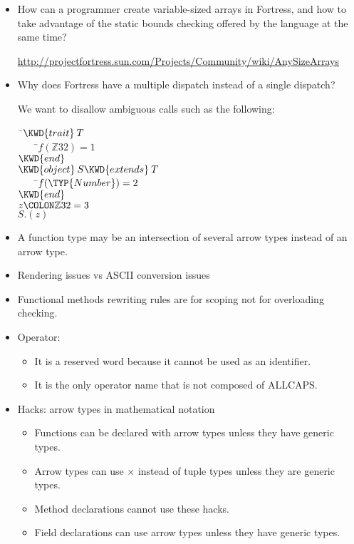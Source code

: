 \begin{itemize}
\item How can a programmer create variable-sized arrays in Fortress, and how to take advantage of the static bounds checking offered by the language at the same time?

\url{http://projectfortress.sun.com/Projects/Community/wiki/AnySizeArrays}

\item Why does Fortress have a multiple dispatch instead of a single dispatch?

We want to disallow ambiguous calls such as the following:
\begin{Fortress}
{\tt~}\pushtabs\=\+\( \KWD{trait}\:T\)\\
{\tt~~~~}\pushtabs\=\+\(     f(\mathbb{Z}32) = 1\)\-\\\poptabs
\( \KWD{end}\)\\
\( \KWD{object}\:S \KWD{extends}\:T\)\\
{\tt~~~~}\pushtabs\=\+\(     f(\TYP{Number}) = 2\)\-\\\poptabs
\( \KWD{end}\)\\
\( z\COLON \mathbb{Z}32 = 3\)\\
\( S.(z)\)\-\\\poptabs
\end{Fortress}


\item A function type may be an intersection of several arrow types
instead of an arrow type.

\item Rendering issues vs ASCII conversion issues

\item Functional methods rewriting rules are for scoping
not for overloading checking.

\item Operator: 
  \begin{itemize}
  \item It is a reserved word because it cannot be used as an identifier.
  \item It is the only operator name that is not composed of ALLCAPS.
  \end{itemize}

\item Hacks: arrow types in mathematical notation
  \begin{itemize}
  \item Functions can be declared with arrow types unless they have
  generic types.
  \item Arrow types can use $\times$ instead of tuple types unless they are
  generic types.
  \item Method declarations cannot use these hacks.
  \item Field declarations can use arrow types unless they have generic
  types.
  \end{itemize}


\end{itemize}
